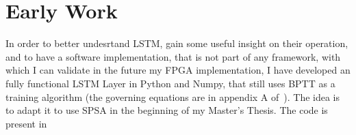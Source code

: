 \chapter{Early Work}\label{chap:earlyWork}
In order to better undesrtand LSTM,  gain some useful insight on their operation, and to have a software implementation, that is not part of any framework, with which I can validate in the future my FPGA implementation, I have developed an fully functional LSTM Layer in Python and Numpy, that still uses BPTT as a training algorithm (the governing equations are in appendix A of~\cite{Greff15}). The idea is to adapt it to use SPSA in the beginning of my Master's Thesis. The code is present in


